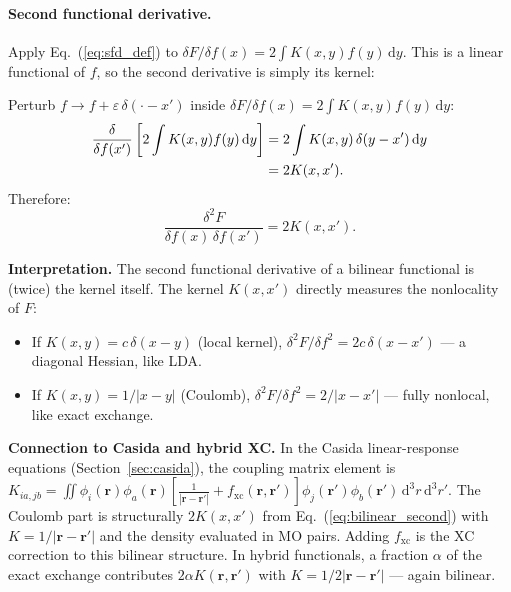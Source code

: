 \documentclass[12pt,letterpaper]{article}
\newcommand{\dd}{\mathrm{d}}
\newcommand{\fxc}{f_{\mathrm{xc}}}
\theoremstyle{definition}
\begin{document}
\paragraph{Second functional derivative.}
Apply Eq.~(\ref{eq:sfd_def}) to $\delta F/\delta f(x) = 2\int K(x,y)f(y)\,\dd y$.
This is a linear functional of $f$, so the second derivative is simply its
kernel:
\begin{derivbox}
Perturb $f\to f+\varepsilon\,\delta(\cdot-x')$ inside
$\delta F/\delta f(x) = 2\int K(x,y)f(y)\,\dd y$:
\begin{align}
  \frac{\delta}{\delta f(x')}\left[2\int K(x,y)f(y)\,\dd y\right]
  &= 2\int K(x,y)\,\delta(y-x')\,\dd y \notag\\
  &= 2K(x,x').
\end{align}
Therefore:
\begin{equation}
  \boxed{\frac{\delta^2 F}{\delta f(x)\,\delta f(x')} = 2K(x,x').}
  \label{eq:bilinear_second}
\end{equation}
\end{derivbox}

\noindent\textbf{Interpretation.}
The second functional derivative of a bilinear functional is (twice) the kernel
itself.  The kernel $K(x,x')$ directly measures the nonlocality of $F$:
\begin{itemize}[leftmargin=*]
  \item If $K(x,y)=c\,\delta(x-y)$ (local kernel), $\delta^2F/\delta f^2 = 2c\,\delta(x-x')$
    --- a diagonal Hessian, like LDA.
  \item If $K(x,y)=1/|x-y|$ (Coulomb), $\delta^2 F/\delta f^2 = 2/|x-x'|$
    --- fully nonlocal, like exact exchange.
\end{itemize}

\begin{insight}
\textbf{Connection to Casida and hybrid XC.}
In the Casida linear-response equations (Section~\ref{sec:casida}),
the coupling matrix element is
$K_{ia,jb} = \iint\phi_i(\bm{r})\phi_a(\bm{r})
\left[\frac{1}{|\bm{r}-\bm{r}'|}+\fxc(\bm{r},\bm{r}')\right]
\phi_j(\bm{r}')\phi_b(\bm{r}')\,\dd^3r\,\dd^3r'$.
The Coulomb part is structurally $2K(x,x')$ from Eq.~(\ref{eq:bilinear_second})
with $K = 1/|\bm{r}-\bm{r}'|$ and the density evaluated in MO pairs.
Adding $\fxc$ is the XC correction to this bilinear structure.
In hybrid functionals, a fraction $\alpha$ of the exact exchange contributes
$2\alpha K(\bm{r},\bm{r}')$ with $K=1/2|\bm{r}-\bm{r}'|$ --- again bilinear.
\end{insight}
\end{document}

